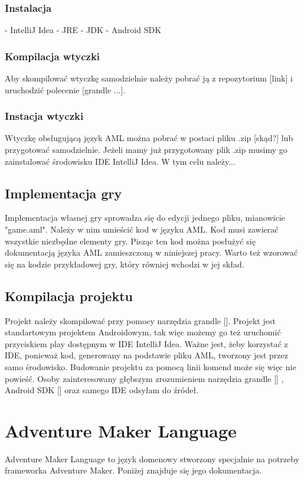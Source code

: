 \documentclass	{xmgr}
\begin{document}
\subsection{Instalacja}
- IntelliJ Idea
- JRE
- JDK
- Android SDK

\subsection{Kompilacja wtyczki}
Aby skompilować wtyczkę samodzielnie należy pobrać ją z repozytorium [link] i uruchodzić polecenie [grandle ...]. 


\subsection{Instacja wtyczki}
Wtyczkę obsługującą język AML można pobrać w postaci pliku .zip [skąd?] lub przygotować samodzielnie. Jeżeli mamy już przygotowany plik .zip musimy go zainstalować środowisku IDE IntelliJ Idea. W tym celu należy...

\section{Implementacja gry}
Implementacja własnej gry sprowadza się do edycji jednego pliku, mianowicie "game.aml". Należy w nim umieścić kod w języku AML. Kod musi  zawierać wszystkie niezbędne elementy gry. Pisząc ten kod można posłużyć się dokumentacją języka AML zamieszczoną w niniejszej pracy. Warto też wzorować się na kodzie przykładowej gry, który równiej wchodzi w jej skład.

\section{Kompilacja projektu}
Projekt należy skompilować przy pomocy narzędzia grandle []. Projekt jest standartowym projektem Androidowym, tak więc możemy go też uruchomić przyciskiem play dostępnym w IDE IntelliJ Idea. Ważne jest, żeby korzystać z IDE, ponieważ kod, generowany na podstawie pliku AML, tworzony jest przez samo środowisko. Budowanie projektu za pomocą linii komend może się więc nie powieść. Osoby zainteresowany głębszym zrozumieniem narzędzia grandle [] , Android SDK [] oraz samego IDE odsyłam do źródeł. 


\chapter{Adventure Maker Language} 
Adventure Maker Language to język domenowy stworzony specjalnie na potrzeby frameworka Adventure Maker. Poniżej znajduje się jego dokumentacja.
\end{document}
